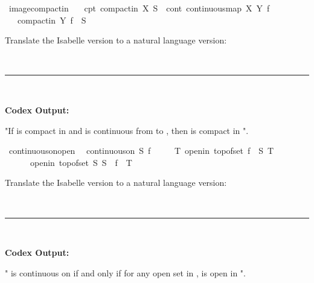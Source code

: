 \documentclass{article}
\begin{document}
\begin{boxB}
\begin{isabelle}
\isamarkupfalse \ image{\isacharunderscore}{\kern0pt}compactin{\isacharcolon}{\kern0pt}\isanewline
\ \ \ cpt{\isacharcolon}{\kern0pt}\ {\isachardoublequoteopen}compactin\ X\ S{\isachardoublequoteclose}\ \ cont{\isacharcolon}{\kern0pt}\ {\isachardoublequoteopen}continuous{\isacharunderscore}{\kern0pt}map\ X\ Y\ f{\isachardoublequoteclose}\isanewline
\ \ \ {\isachardoublequoteopen}compactin\ Y\ {\isacharparenleft}{\kern0pt}f\ {\isacharbackquote}{\kern0pt}\ S{\isacharparenright}{\kern0pt}{\isachardoublequoteclose}
\end{isabelle}
Translate the Isabelle version to a natural language version:

\
\hrule
\

\textbf{Codex Output:}

"If  is compact in  and  is continuous from  to , then  is compact in ".
\end{boxB}

\begin{boxB}
\begin{isabelle}
\isamarkupfalse \ continuous{\isacharunderscore}{\kern0pt}on{\isacharunderscore}{\kern0pt}open{\isacharcolon}{\kern0pt}\isanewline
\ \ {\isachardoublequoteopen}continuous{\isacharunderscore}{\kern0pt}on\ S\ f\ {\isasymlongleftrightarrow}\isanewline
\ \ \ \ {\isacharparenleft}{\kern0pt}{\isasymforall}T{\isachardot}{\kern0pt}\ openin\ {\isacharparenleft}{\kern0pt}top{\isacharunderscore}{\kern0pt}of{\isacharunderscore}{\kern0pt}set\ {\isacharparenleft}{\kern0pt}f\ {\isacharbackquote}{\kern0pt}\ S{\isacharparenright}{\kern0pt}{\isacharparenright}{\kern0pt}\ T\ {\isasymlongrightarrow}\isanewline
\ \ \ \ \ \ openin\ {\isacharparenleft}{\kern0pt}top{\isacharunderscore}{\kern0pt}of{\isacharunderscore}{\kern0pt}set\ S{\isacharparenright}{\kern0pt}\ {\isacharparenleft}{\kern0pt}S\ {\isasyminter}\ f\ {\isacharminus}{\kern0pt}{\isacharbackquote}{\kern0pt}\ T{\isacharparenright}{\kern0pt}{\isacharparenright}{\kern0pt}{\isachardoublequoteclose}
\end{isabelle}
Translate the Isabelle version to a natural language version:

\
\hrule
\

\textbf{Codex Output:}

" is continuous on  if and only if for any open set  in ,  is open in ".
\end{boxB}
\end{document}
